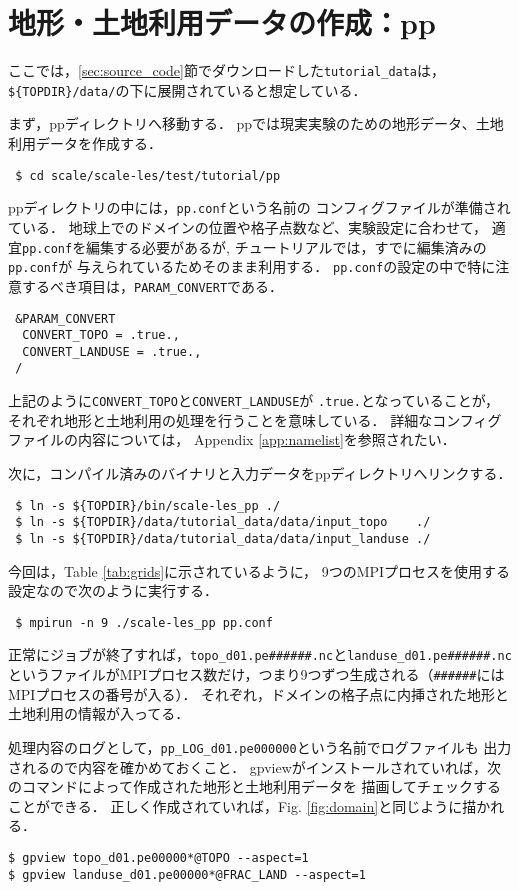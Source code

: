 
\section{地形・土地利用データの作成：pp}

ここでは，\ref{sec:source_code}節でダウンロードした\verb|tutorial_data|は，
\verb|${TOPDIR}/data/|の下に展開されていると想定している．

まず，ppディレクトリへ移動する．
ppでは現実実験のための地形データ、土地利用データを作成する．
\begin{verbatim}
 $ cd scale/scale-les/test/tutorial/pp
\end{verbatim}
ppディレクトリの中には，\verb|pp.conf|という名前の
コンフィグファイルが準備されている．
地球上でのドメインの位置や格子点数など、実験設定に合わせて，
適宜\verb|pp.conf|を編集する必要があるが,
チュートリアルでは，すでに編集済みの\verb|pp.conf|が
与えられているためそのまま利用する．
\verb|pp.conf|の設定の中で特に注意するべき項目は，\verb|PARAM_CONVERT|である．
\begin{verbatim}
 &PARAM_CONVERT
  CONVERT_TOPO = .true.,
  CONVERT_LANDUSE = .true.,
 /
\end{verbatim}
上記のように\verb|CONVERT_TOPO|と\verb|CONVERT_LANDUSE|が
\verb|.true.|となっていることが，
それぞれ地形と土地利用の処理を行うことを意味している．
詳細なコンフィグファイルの内容については，
Appendix \ref{app:namelist}を参照されたい．

次に，コンパイル済みのバイナリと入力データをppディレクトリへリンクする．
\begin{verbatim}
 $ ln -s ${TOPDIR}/bin/scale-les_pp ./
 $ ln -s ${TOPDIR}/data/tutorial_data/data/input_topo    ./
 $ ln -s ${TOPDIR}/data/tutorial_data/data/input_landuse ./
\end{verbatim}
今回は，Table \ref{tab:grids}に示されているように，
9つのMPIプロセスを使用する設定なので次のように実行する．
\begin{verbatim}
 $ mpirun -n 9 ./scale-les_pp pp.conf
\end{verbatim}
正常にジョブが終了すれば，\verb|topo_d01.pe######.nc|と\verb|landuse_d01.pe######.nc|というファイルがMPIプロセス数だけ，つまり9つずつ生成される（\verb|######|にはMPIプロセスの番号が入る）．
それぞれ，ドメインの格子点に内挿された地形と土地利用の情報が入ってる．

処理内容のログとして，\verb|pp_LOG_d01.pe000000|という名前でログファイルも
出力されるので内容を確かめておくこと．
gpviewがインストールされていれば，次のコマンドによって作成された地形と土地利用データを
描画してチェックすることができる．
正しく作成されていれば，Fig. \ref{fig:domain}と同じように描かれる．
\begin{verbatim}
$ gpview topo_d01.pe00000*@TOPO --aspect=1
$ gpview landuse_d01.pe00000*@FRAC_LAND --aspect=1
\end{verbatim}


